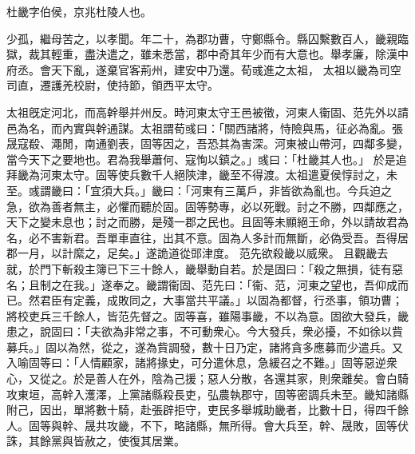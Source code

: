 \begin{pinyinscope}
 
 
 杜畿字伯侯，京兆杜陵人也。
 
 
 少孤，繼母苦之，以孝聞。年二十，為郡功曹，守鄭縣令。縣囚繫數百人，畿親臨獄，裁其輕重，盡決遣之，雖未悉當，郡中奇其年少而有大意也。舉孝廉，除漢中府丞。會天下亂，遂棄官客荊州，建安中乃還。荀彧進之太祖，
 太祖以畿為司空司直，遷護羌校尉，使持節，領西平太守。
 
 
太祖旣定河北，而高幹舉并州反。時河東太守王邑被徵，河東人衞固、范先外以請邑為名，而內實與幹通謀。太祖謂荀彧曰：「關西諸將，恃險與馬，征必為亂。張晟寇殽、澠閒，南通劉表，固等因之，吾恐其為害深。河東被山帶河，四鄰多變，當今天下之要地也。君為我舉蕭何、寇恂以鎮之。」彧曰：「杜畿其人也。」
 於是追拜畿為河東太守。固等使兵數千人絕陝津，畿至不得渡。太祖遣夏侯惇討之，未至。彧謂畿曰：「宜須大兵。」畿曰：「河東有三萬戶，非皆欲為亂也。今兵迫之急，欲為善者無主，必懼而聽於固。固等勢專，必以死戰。討之不勝，四鄰應之，天下之變未息也；討之而勝，是殘一郡之民也。且固等未顯絕王命，外以請故君為名，必不害新君。吾單車直往，出其不意。固為人多計而無斷，必偽受吾。吾得居郡一月，以計縻之，足矣。」遂詭道從郖津度。
 范先欲殺畿以威衆。
 且觀畿去就，於門下斬殺主簿已下三十餘人，畿舉動自若。於是固曰：「殺之無損，徒有惡名；且制之在我。」遂奉之。畿謂衞固、范先曰：「衞、范，河東之望也，吾仰成而已。然君臣有定義，成敗同之，大事當共平議。」以固為都督，行丞事，領功曹；將校吏兵三千餘人，皆范先督之。固等喜，雖陽事畿，不以為意。固欲大發兵，畿患之，說固曰：「夫欲為非常之事，不可動衆心。今大發兵，衆必擾，不如徐以貲募兵。」固以為然，從之，遂為貲調發，數十日乃定，諸將貪多應募而少遣兵。又入喻固等曰：「人情顧家，諸將掾史，可分遣休息，急緩召之不難。」固等惡逆衆心，又從之。於是善人在外，陰為己援；惡人分散，各還其家，則衆離矣。會白騎攻東垣，高幹入濩澤，上黨諸縣殺長吏，弘農執郡守，固等密調兵未至。畿知諸縣附己，因出，單將數十騎，赴張辟拒守，吏民多舉城助畿者，比數十日，得四千餘人。固等與幹、晟共攻畿，不下，略諸縣，無所得。會大兵至，幹、晟敗，固等伏誅，其餘黨與皆赦之，使復其居業。
 

\end{pinyinscope}

